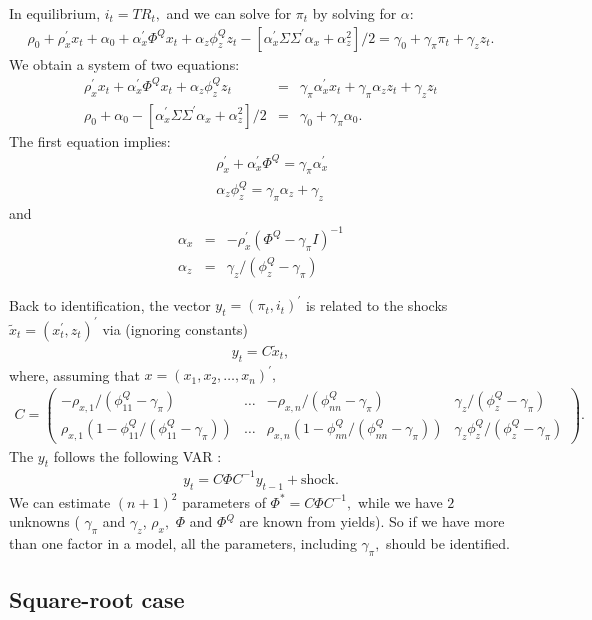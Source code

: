 \documentclass[11pt]{article}
\begin{document}
In equilibrium,  $i_t=TR_t,$ and we can solve for $\pi_t$ by solving for $\alpha:$
\begin{eqnarray}
     \rho_0 +  \rho_x^{\prime} x_t + \alpha_0+\alpha_x^{\prime}\Phi^Q x_t + \alpha_z \phi_z^Q z_t- [ \alpha_x^{\prime} \Sigma \Sigma^{\prime} \alpha_x+\alpha_z^2]/2 = \gamma_0 + \gamma_{\pi} \pi_t+\gamma_z z_t.
\end{eqnarray}
    We obtain a system of two equations:
 \begin{eqnarray}
     \rho_x^{\prime} x_t + \alpha_x^{\prime}\Phi^Q x_t + \alpha_z \phi_z^Q z_t & = &\gamma_{\pi}\alpha_x^{\prime}x_t+ \gamma_{\pi} \alpha_z z_t +\gamma_z z_t\\
    \rho_0 + \alpha_0 -[ \alpha_x^{\prime} \Sigma \Sigma^{\prime} \alpha_x+\alpha_z^2]/2 &=& \gamma_0 +\gamma_{\pi}\alpha_0.
 \end{eqnarray}
 The first equation implies:
 \begin{eqnarray}
  & &    \rho_x^{\prime}+\alpha_x^{\prime}\Phi^Q=\gamma_{\pi}\alpha_x^{\prime} \\
  & &    \alpha_z \phi_z^Q = \gamma_{\pi} \alpha_z + \gamma_z
 \end{eqnarray}
 and
 \begin{eqnarray}
    \alpha_x&=&-\rho_x^{\prime}(\Phi^Q-\gamma_{\pi}I)^{-1} \\
    \alpha_z&=&\gamma_{z}/(\phi_z^Q-\gamma_{\pi})
 \end{eqnarray}

 Back to identification, the vector $y_t=(\pi_t, i_t)^{\prime}$ is related to the shocks $\tilde{x}_t=(x_t^{\prime},z_t)^{\prime}$ via (ignoring constants)
\begin{eqnarray}
    y_t=C \tilde{x}_t,
\end{eqnarray}
where, assuming  that $x=(x_1, x_2, \ldots, x_n)^{\prime},$
\begin{eqnarray}
    C=
\left(
\begin{array}{cccc}
-\rho_{x,1} /(\phi_{11}^Q-\gamma_{\pi})  &    \ldots &-\rho_{x,n} /(\phi_{nn}^Q-\gamma_{\pi})  &  \gamma_{z}/(\phi_z^Q-\gamma_{\pi})\\
\rho_{x,1} (1-\phi_{11}^Q/(\phi_{11}^Q-\gamma_{\pi}))   & \ldots &  \rho_{x,n} (1-\phi_{nn}^Q/(\phi_{nn}^Q-\gamma_{\pi}) ) &  \gamma_{z}\phi_z^Q/(\phi_z^Q-\gamma_{\pi})
\end{array}
\right).
\end{eqnarray}
The $y_t$ follows the following VAR :
\begin{eqnarray}
   y_t= C \Phi C^{-1} y_{t-1} + \mbox{shock}.
\end{eqnarray}
We can estimate $(n+1)^2$ parameters of $\Phi^*=C \Phi C^{-1},$ while we have $2$ unknowns ( $\gamma_{\pi}$ and $\gamma_z$, $\rho_x,$ $\Phi$ and $\Phi^Q$ are known from yields). So if we have more than one factor in a model, all the parameters, including $\gamma_{\pi},$ should be identified.

 \subsection*{Square-root case}
\end{document}
